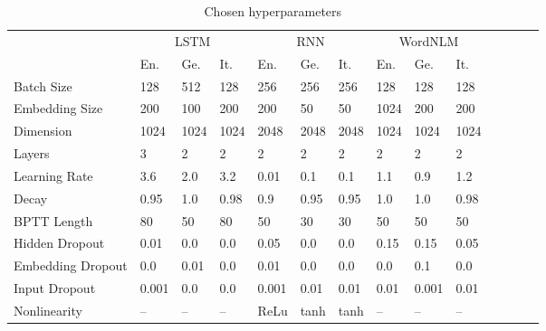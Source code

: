  \begin{table*}[t]
 	\begin{tabular}{l|lll|lll|lllllll}
 		&  \multicolumn{3}{c}{LSTM} & \multicolumn{3}{|c|}{RNN} & \multicolumn{3}{c}{WordNLM} \\
 		       &  En.     &  Ge.    & It.    & En.    &    Ge.   &  It.     &  En.     &   Ge.   &    It. \\  \hline
 	Batch Size     &  128   &  512  & 128  & 256  & 256    &  256   &  128   &   128 &  128   \\              
 	Embedding Size &  200   &  100  & 200  & 200  & 50     &  50    &  1024  &   200 &  200   \\             
 	Dimension      &  1024  &  1024 & 1024 & 2048 & 2048   &  2048  &  1024  &  1024 &  1024  \\  
 	Layers         &  3     &  2    & 2    & 2    & 2      &  2     &  2     &  2    &  2     \\   
 	Learning Rate  &  3.6   &  2.0  & 3.2  & 0.01 & 0.1    &  0.1   &  1.1   &  0.9  &  1.2   \\ 
 	Decay          &  0.95  &  1.0  & 0.98 & 0.9  & 0.95   &  0.95  &  1.0   &  1.0  &  0.98  \\
 	BPTT Length    &  80    &  50   & 80   & 50   & 30     &  30    &  50    &  50   &  50    \\
 	Hidden Dropout &  0.01  &  0.0  & 0.0  & 0.05 & 0.0    &  0.0   &  0.15  &  0.15 &  0.05  \\   
 	Embedding Dropout  & 0.0& 0.01  & 0.0  & 0.01 & 0.0    &  0.0   &  0.0   &  0.1  &  0.0   \\   
 	Input Dropout  & 0.001 &  0.0   & 0.0  & 0.001& 0.01   &  0.01  &  0.01  &  0.001&  0.01  \\ 
         Nonlinearity   &   --  & --     & --   & ReLu & tanh   &  tanh  &   --   &  --   &  --    \\                   
 \end{tabular}
 	\caption{Chosen hyperparameters}
 \end{table*}






